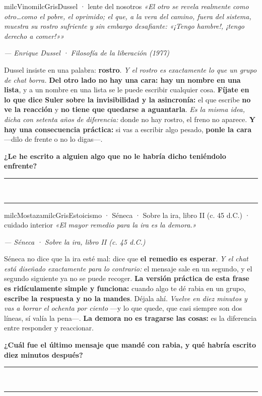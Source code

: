 \documentclass[11pt,letterpaper]{article}
\newcommand{\linead}[1]{\noindent\color{milcLinea}\rule{#1}{0.5pt}\color{milcNegro}}
\begin{document}
\begin{softbox}{milcVino}{milcGris}{Dussel · lente del nosotros}
\textit{«El otro se revela realmente como otro\ldots como el pobre, el oprimido; el que, a la vera del camino, fuera del sistema, muestra su rostro sufriente y sin embargo desafiante: «¡Tengo hambre!, ¡tengo derecho a comer!»»}

{\footnotesize\itshape\color{milcNegro!70}--- Enrique Dussel · Filosofía de la liberación (1977)}

Dussel insiste en una palabra: \textbf{rostro}. \emph{Y el rostro es exactamente lo que un grupo de chat borra.} \textbf{Del otro lado no hay una cara: hay un nombre en una lista}, y a un nombre en una lista se le puede escribir cualquier cosa. \textbf{Fíjate en lo que dice Suler sobre la invisibilidad y la asincronía:} el que escribe \textbf{no ve la reacción} y \textbf{no tiene que quedarse a aguantarla}. \emph{Es la misma idea, dicha con setenta años de diferencia:} donde no hay rostro, el freno no aparece. \textbf{Y hay una consecuencia práctica:} si vas a escribir algo pesado, \textbf{ponle la cara} ---dilo de frente o no lo digas---.

\textbf{¿Le he escrito a alguien algo que no le habría dicho teniéndolo enfrente?}
\end{softbox}
\linead{\linewidth}\\[1mm]
\linead{\linewidth}

\begin{softbox}{milcMostaza}{milcGris}{Estoicismo · Séneca · Sobre la ira, libro II (c. 45 d.C.) · cuidado interior}
\textit{«El mayor remedio para la ira es la demora.»}

{\footnotesize\itshape\color{milcNegro!70}--- Séneca · Sobre la ira, libro II (c. 45 d.C.)}

Séneca no dice que la ira esté mal: dice que \textbf{el remedio es esperar}. \emph{Y el chat está diseñado exactamente para lo contrario:} el mensaje sale en un segundo, y el segundo siguiente ya no se puede recoger. \textbf{La versión práctica de esta frase es ridículamente simple y funciona:} cuando algo te dé rabia en un grupo, \textbf{escribe la respuesta y no la mandes}. Déjala ahí. \emph{Vuelve en diez minutos y vas a borrar el ochenta por ciento} ---y lo que quede, que casi siempre son dos líneas, sí valía la pena---. \textbf{La demora no es tragarse las cosas:} es la diferencia entre responder y reaccionar.

\textbf{¿Cuál fue el último mensaje que mandé con rabia, y qué habría escrito diez minutos después?}
\end{softbox}
\linead{\linewidth}\\[1mm]
\linead{\linewidth}
\end{document}
